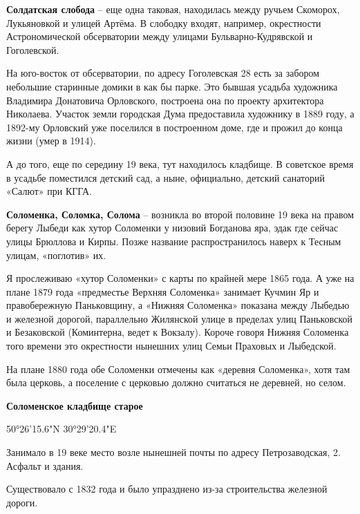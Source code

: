 \medskip

\textbf{Солдатская слобода} – еще одна таковая, находилась между ручьем Скоморох, Лукьяновкой и улицей Артёма. В слободку входят, например, окрестности Астрономической обсерватории между улицами Бульварно-Кудрявской и Гоголевской.

На юго-восток от обсерватории, по адресу Гоголевская 28 есть за забором небольшие старинные домики в как бы парке. Это бывшая усадьба художника Владимира Донатовича Орловского, построена она по проекту архитектора Николаева. Участок земли городская Дума предоставила художнику в 1889 году, а 1892-му Орловский уже поселился в построенном доме, где и прожил до конца жизни (умер в 1914).

А до того, еще по середину 19 века, тут находилось кладбище. В советское время в усадьбе поместился детский сад, а ныне, официально, детский санаторий «Салют» при КГГА.\\

\medskip

\textbf{Соломенка, Соломка, Солома} – возникла во второй половине 19 века на правом берегу Лыбеди как хутор Соломенки у низовий Богданова яра, эдак где сейчас улицы Брюллова и Кирпы. Позже название распространилось наверх к Тесным улицам, «поглотив» их. 

Я прослеживаю «хутор Соломенки» с карты по крайней мере 1865 года. А уже на плане 1879 года «предместье Верхняя Соломенка» занимает Кучмин Яр и правобережную Паньковщину, а «Нижняя Соломенка» показана между Лыбедью и железной дорогой, параллельно Жилянской улице в пределах улиц Паньковской и Безаковской (Коминтерна, ведет к Вокзалу). Короче говоря Нижняя Соломенка того времени это окрестности нынешних улиц Семьи Праховых и Лыбедской.

На плане 1880 года обе Соломенки отмечены как «деревня Соломенка», хотя там была церковь, а поселение с церковью должно считаться не деревней, но селом.\\

\medskip

\textbf{Соломенское кладбище старое}

50°26'15.6"N 30°29'20.4"E

Занимало в 19 веке место возле нынешней почты по адресу Петрозаводская, 2. Асфальт и здания.

Существовало с 1832 года и было упразднено из-за строительства железной дороги.
\\

\medskip

